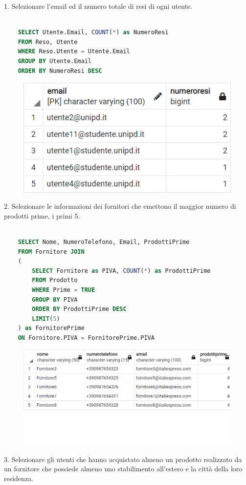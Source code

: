 \documentclass[10pt]{article}
\begin{document}
1. Selezionare l'email ed il numero totale di resi di ogni utente.

\begin{lstlisting}[language=SQL]

    SELECT Utente.Email, COUNT(*) as NumeroResi
    FROM Reso, Utente
    WHERE Reso.Utente = Utente.Email
    GROUP BY Utente.Email
    ORDER BY NumeroResi DESC
\end{lstlisting}

\begin{center}
    \begin{figure}[H]
        \includegraphics[scale=1]{media/query1.png}
        \label{query1}
    \end{figure}
\end{center}
2. Selezionare le informazioni dei fornitori che emettono il maggior numero di prodotti prime, i primi 5.

\begin{lstlisting}[language=SQL]

    SELECT Nome, NumeroTelefono, Email, ProdottiPrime
    FROM Fornitore JOIN
    (
        SELECT Fornitore as PIVA, COUNT(*) as ProdottiPrime
        FROM Prodotto
        WHERE Prime = TRUE
        GROUP BY PIVA
        ORDER BY ProdottiPrime DESC
        LIMIT(5)
    ) as FornitorePrime
    ON Fornitore.PIVA = FornitorePrime.PIVA
\end{lstlisting}

\begin{center}
    \begin{figure}[H]
        \includegraphics[scale=1]{media/query2.png}
        \label{query2}
    \end{figure}
\end{center}
3. Selezionare gli utenti che hanno acquistato almeno un prodotto realizzato da un fornitore che possiede almeno
uno stabilimento all'estero e la città della loro residenza.
\end{document}
